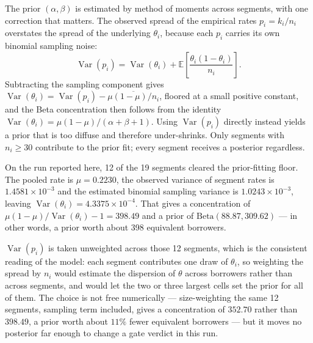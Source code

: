 \documentclass[10pt,a4paper]{article}
\begin{document}
The prior $(\alpha, \beta)$ is estimated by method of moments across segments,
with one correction that matters. The observed spread of the empirical rates
$p_i = k_i / n_i$ overstates the spread of the underlying $\theta_i$, because
each $p_i$ carries its own binomial sampling noise:
%
\begin{equation}
\operatorname{Var}(p_i) = \operatorname{Var}(\theta_i)
  + \mathbb{E}\!\left[\frac{\theta_i(1-\theta_i)}{n_i}\right].
\label{eq:varsplit}
\end{equation}
%
Subtracting the sampling component gives
$\operatorname{Var}(\theta_i) = \operatorname{Var}(p_i) - \overline{\mu(1-\mu)/n_i}$,
floored at a small positive constant, and the Beta concentration then follows
from the identity $\operatorname{Var}(\theta_i) = \mu(1-\mu)/(\alpha + \beta + 1)$.
Using $\operatorname{Var}(p_i)$ directly instead yields a prior that is too diffuse
and therefore under-shrinks. Only segments with $n_i \ge 30$ contribute to the prior
fit; every segment receives a posterior regardless.

On the run reported here, 12 of the 19 segments cleared the prior-fitting floor.
The pooled rate is $\mu = 0.2230$, the observed variance of segment rates is
$1.4581 \times 10^{-3}$ and the estimated binomial sampling variance is
$1.0243 \times 10^{-3}$, leaving $\operatorname{Var}(\theta_i) = 4.3375 \times
10^{-4}$. That gives a concentration of $\mu(1-\mu)/\operatorname{Var}(\theta_i) -
1 = 398.49$ and a prior of $\mathrm{Beta}(88.87, 309.62)$ --- in other words, a
prior worth about 398 equivalent borrowers.

$\operatorname{Var}(p_i)$ is taken unweighted across those 12 segments, which is
the consistent reading of the model: each segment contributes one draw of
$\theta_i$, so weighting the spread by $n_i$ would estimate the dispersion of
$\theta$ across borrowers rather than across segments, and would let the two or
three largest cells set the prior for all of them. The choice is not free
numerically --- size-weighting the same 12 segments, sampling term included, gives
a concentration of $352.70$ rather than $398.49$, a prior worth about $11\%$ fewer
equivalent borrowers --- but it moves no posterior far enough to change a gate
verdict in this run.
\end{document}
